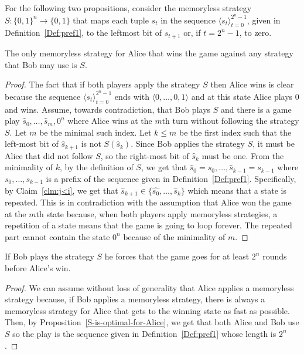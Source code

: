 \documentclass[final,12pt]{elsarticle}
\theoremstyle{definition} \newtheorem{definition}[theorem]{Definition} \newtheorem{observation}[theorem]{Observation} \newtheorem{example}[theorem]{Example} \newtheorem{remark}[theorem]{Remark} \newtheorem{corrolary}[theorem]{Corrolary}
\newcommand{\REF}[2]{#1~\ref{#2}}
\newcommand{\T}[1]{\langle{#1}\rangle}
\begin{document}
For the following two propositions, consider the memoryless strategy $S\colon \{0,1\}^n \to \{0,1\}$ that maps each tuple $s_t$ in the sequence $\T{s_t}_{t=0}^{2^n-1}$, given in \REF{Definition}{Def:pref1}, to the leftmost bit of $s_{t+1}$ or, if $t=2^n-1$,  to zero.
\begin{proposition}
	The only memoryless strategy for Alice that wins the game against any strategy that Bob may use is $S$. \label{S-is-optimal-for-Alice}
	\label{prop:opt-bob}
\end{proposition}
\begin{proof}
	The fact that if both players apply the strategy $S$ then Alice wins is clear because the sequence $\T{s_t}_{t=0}^{2^n-1}$ ends with $\T{0,\dots,0,1}$ and at this state Alice plays 0 and wins.
	Assume, towards contradiction, that Bob plays $S$ and there is a game play $\hat{s}_0,\dots, \hat{s}_m,0^n$ where Alice wins at the $m$th turn without following the strategy $S$. Let $m$ be the minimal such index. Let $k \leq m$ be the first index such that the left-most bit of $ \hat{s}_{k+1}$ is not $S( \hat{s}_k)$. Since Bob applies the strategy $S$, it must be Alice that did not follow $S$, so the right-most bit of $ \hat{s}_k$ must be one. From the minimality of $k$, by the definition of $S$, we get that $ \hat{s}_0=s_0,\dots, \hat{s}_{k-1}=s_{k-1}$ where $s_0,\dots,s_{k-1}$ is a prefix of the sequence given in \REF{Definition}{Def:pref1}. Specifically, by \REF{Claim}{clm:j<i}, we get that $ \hat{s}_{k+1} \in \{ \hat{s_0},\dots,  \hat{s}_k\}$ which means that a state is repeated. This is in contradiction with the assumption that Alice won the game at the $m$th state because, when both players apply memoryless strategies, a repetition of a state means that the game is going to loop forever. The repeated part cannot contain the state $0^n$ because of the minimality of $m$.
\end{proof}

\begin{proposition}
	If Bob plays the strategy $S$ he forces that the game goes for at least $2^n$ rounds before Alice's win.
	\label{prop:opt-alice}
\end{proposition}
\begin{proof}
	We can assume without loss of generality that Alice applies a memoryless strategy because, if Bob applies a memoryless strategy, there is always a memoryless strategy for Alice that gets to the winning state as fast as possible. Then, by \REF{Proposition}{S-is-optimal-for-Alice}, we get that both Alice and Bob use $S$ so the play is the sequence given in \REF{Definition}{Def:pref1} whose length is $2^n$.
\end{proof}
\end{document}
